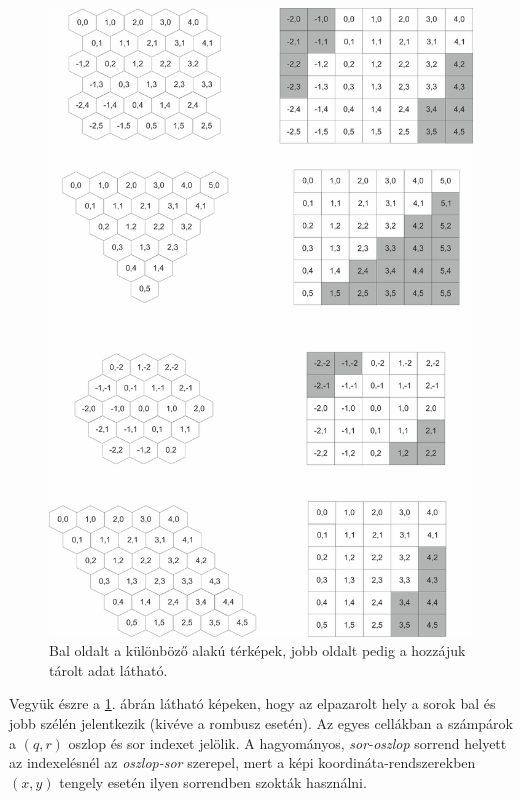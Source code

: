 \begin{figure}[h!]
\centering
\includegraphics[scale=0.2]{kepek/StorageProblem.jpg}
\caption{Bal oldalt a különböző alakú térképek, jobb oldalt pedig a hozzájuk tárolt adat látható.}
\label{fig:StorageProblem}
\end{figure}

\noindent Vegyük észre a \ref{fig:StorageProblem}. ábrán látható képeken, hogy az elpazarolt hely a sorok bal és jobb szélén jelentkezik (kivéve a rombusz esetén). Az egyes cellákban a számpárok a $(q, r)$ oszlop és sor indexet jelölik. A hagyományos, \textit{sor-oszlop} sorrend helyett az indexelésnél az \textit{oszlop-sor} szerepel, mert a képi koordináta-rendszerekben $(x, y)$ tengely esetén ilyen sorrendben szokták használni.

